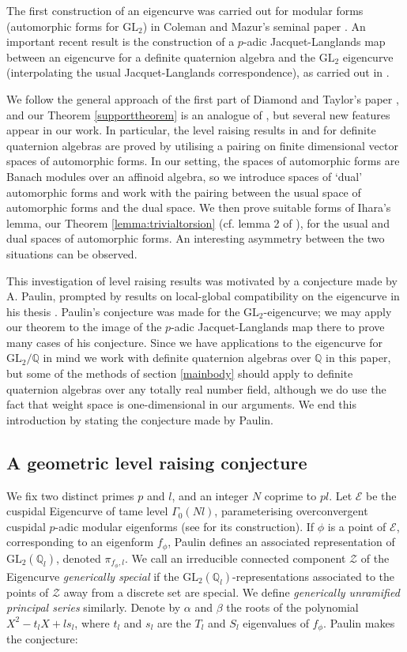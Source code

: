 \documentclass[a4paper, notitlepage]{amsart}
\newcommand{\Q}{\ensuremath{\mathbb{Q}}\xspace}
\begin{document}
The first construction of an eigencurve was carried out for modular forms (automorphic forms for $\mathrm{GL}_2$) in Coleman and Mazur's seminal paper \cite{CM}. An important recent result is the construction of a $p$-adic Jacquet-Langlands map between an eigencurve for a definite quaternion algebra and the $\mathrm{GL}_2$ eigencurve (interpolating the usual Jacquet-Langlands correspondence), as carried out in \cite{MR2111512}.

We follow the general approach of the first part of Diamond and Taylor's paper \cite{DT}, and our Theorem \ref{supporttheorem} is an analogue of \cite[Theorem 1]{DT}, but several new features appear in our work. In particular, the level raising results in \cite{Ta} and \cite{DT} for definite quaternion algebras are proved by utilising a pairing on finite dimensional vector spaces of automorphic forms. In our setting, the spaces of automorphic forms are Banach modules over an affinoid algebra, so we introduce spaces of `dual' automorphic forms and work with the pairing between the usual space of automorphic forms and the dual space. We then prove suitable forms of Ihara's lemma, our Theorem \ref{lemma:trivialtorsion} (cf. lemma 2 of \cite{DT}), for the usual and dual spaces of automorphic forms. An interesting asymmetry between the two situations can be observed.

This investigation of level raising results was motivated by a conjecture made by A. Paulin, prompted by results on local-global compatibility on the eigencurve in his thesis \cite{Pa}. Paulin's conjecture was made for the $\mathrm{GL}_2$-eigencurve; we may apply our theorem to the image of the $p$-adic Jacquet-Langlands map there to prove many cases of his conjecture. Since we have applications to the eigencurve for $\mathrm{GL}_2/\Q$ in mind we work with definite quaternion algebras over $\Q$ in this paper, but some of the methods of section \ref{mainbody} should apply to definite quaternion algebras over any totally real number field, although we do use the fact that weight space is one-dimensional in our arguments.
We end this introduction by stating the conjecture made by Paulin.

\subsection{A geometric level raising conjecture}
We fix two distinct primes $p$ and $l$, and an integer $N$ coprime to $pl$. Let $\mathscr{E}$ be the cuspidal Eigencurve of tame level $\Gamma_0(Nl)$, parameterising overconvergent cuspidal $p$-adic modular eigenforms (see \cite{Bu2} for its construction). If $\phi$ is a point of $\mathscr{E}$, corresponding to an eigenform $f_\phi$, Paulin defines an associated representation of $\mathrm{GL}_2(\Q_l)$, denoted $\pi_{f_\phi,l}$. We call an irreducible connected component $\mathscr{Z}$ of the Eigencurve \emph{generically special} if the $\mathrm{GL}_2(\Q_l)$-representations associated to the points of $\mathscr{Z}$ away from a discrete set are special. We define \emph{generically unramified principal series} similarly. Denote by $\alpha$ and $\beta$ the roots of the polynomial $X^2-t_lX+ls_l$, where $t_l$ and $s_l$ are the $T_l$ and $S_l$ eigenvalues of $f_\phi$. Paulin makes the conjecture:
\end{document}
